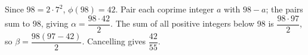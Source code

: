 Since $ 98=2\cdot7^2 $, $\phi(98)=42 $. Pair each coprime integer $ a $ with $ 98-a $; the pairs sum to 98, giving $\alpha=\dfrac{98\cdot42}{2}$. The sum of all positive integers below 98 is $\dfrac{98\cdot97}{2}$, so $\beta=\dfrac{98(97-42)}{2}$. Cancelling gives $\boxed{\dfrac{42}{55}}$.
